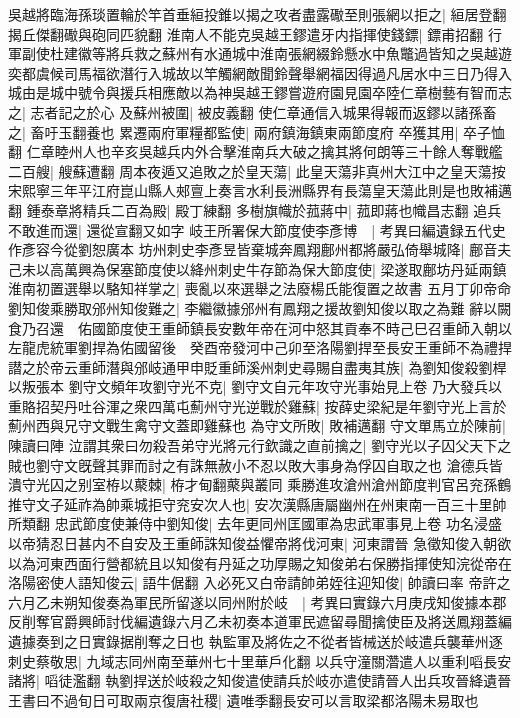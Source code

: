 吳越將臨海孫琰置輪於竿首垂絙投錐以揭之攻者盡露礮至則張網以拒之|{
	絙居登翻揭丘傑翻礮與砲同匹貌翻}
淮南人不能克吳越王鏐遣牙内指揮使錢鏢|{
	鏢甫招翻}
行軍副使杜建徽等將兵救之蘇州有水通城中淮南張網綴鈴懸水中魚鼈過皆知之吳越遊奕都虞候司馬福欲潛行入城故以竿觸網敵聞鈴聲舉網福因得過凡居水中三日乃得入城由是城中號令與援兵相應敵以為神吳越王鏐嘗遊府園見園卒陸仁章樹藝有智而志之|{
	志者記之於心}
及蘇州被圍|{
	被皮義翻}
使仁章通信入城果得報而返鏐以諸孫畜之|{
	畜吁玉翻養也}
累遷兩府軍糧都監使|{
	兩府鎮海鎮東兩節度府}
卒獲其用|{
	卒子恤翻}
仁章睦州人也辛亥吳越兵内外合擊淮南兵大破之擒其將何朗等三十餘人奪戰艦二百艘|{
	艘蘇遭翻}
周本夜遁又追敗之於皇天蕩|{
	此皇天蕩非真州大江中之皇天蕩按宋熙寧三年平江府崑山縣人郟亶上奏言水利長洲縣界有長蕩皇天蕩此則是也敗補邁翻}
鍾泰章將精兵二百為殿|{
	殿丁練翻}
多樹旗幟於菰蔣中|{
	菰即蔣也幟昌志翻}
追兵不敢進而還|{
	還從宣翻又如字}
岐王所署保大節度使李彥博　|{
	考異曰編遺録五代史作彥容今從劉恕廣本}
坊州刺史李彥昱皆棄城奔鳳翔鄜州都將嚴弘倚舉城降|{
	鄜音夫}
己未以高萬興為保塞節度使以絳州刺史牛存節為保大節度使|{
	梁遂取鄜坊丹延兩鎮}
淮南初置選舉以駱知祥掌之|{
	喪亂以來選舉之法廢楊氏能復置之故書}
五月丁卯帝命劉知俊乘勝取邠州知俊難之|{
	李繼徽據邠州有鳳翔之援故劉知俊以取之為難}
辭以闕食乃召還　佑國節度使王重師鎮長安數年帝在河中怒其貢奉不時己巳召重師入朝以左龍虎統軍劉捍為佑國留後　癸酉帝發河中己卯至洛陽劉捍至長安王重師不為禮捍譛之於帝云重師潛與邠岐通甲申貶重師溪州刺史尋賜自盡夷其族|{
	為劉知俊殺劉桿以叛張本}
劉守文頻年攻劉守光不克|{
	劉守文自元年攻守光事始見上卷}
乃大發兵以重賂招契丹吐谷渾之衆四萬屯薊州守光逆戰於雞蘇|{
	按薛史梁紀是年劉守光上言於薊州西與兄守文戰生禽守文蓋即雞蘇也}
為守文所敗|{
	敗補邁翻}
守文單馬立於陳前|{
	陳讀曰陣}
泣謂其衆曰勿殺吾弟守光將元行欽識之直前擒之|{
	劉守光以子囚父天下之賊也劉守文旣聲其罪而討之有誅無赦小不忍以敗大事身為俘囚自取之也}
滄德兵皆潰守光囚之别室栫以藂棘|{
	栫才甸翻藂與叢同}
乘勝進攻滄州滄州節度判官呂兖孫鶴推守文子延祚為帥乘城拒守兖安次人也|{
	安次漢縣唐屬幽州在州東南一百三十里帥所類翻}
忠武節度使兼侍中劉知俊|{
	去年更同州匡國軍為忠武軍事見上卷}
功名浸盛以帝猜忍日甚内不自安及王重師誅知俊益懼帝將伐河東|{
	河東謂晉}
急徵知俊入朝欲以為河東西面行營都統且以知俊有丹延之功厚賜之知俊弟右保勝指揮使知浣從帝在洛陽密使人語知俊云|{
	語牛倨翻}
入必死又白帝請帥弟姪往迎知俊|{
	帥讀曰率}
帝許之六月乙未朔知俊奏為軍民所留遂以同州附於岐　|{
	考異曰實錄六月庚戌知俊據本郡反削奪官爵興師討伐編遺錄六月乙未初奏本道軍民遮留尋聞擒使臣及將送鳳翔蓋編遺據奏到之日實錄据削奪之日也}
執監軍及將佐之不從者皆械送於岐遣兵襲華州逐刺史蔡敬思|{
	九域志同州南至華州七十里華戶化翻}
以兵守潼關濳遣人以重利㗖長安諸將|{
	㗖徒濫翻}
執劉捍送於岐殺之知俊遣使請兵於岐亦遣使請晉人出兵攻晉絳遺晉王書曰不過旬日可取兩京復唐社稷|{
	遺唯季翻長安可以言取梁都洛陽未易取也}
